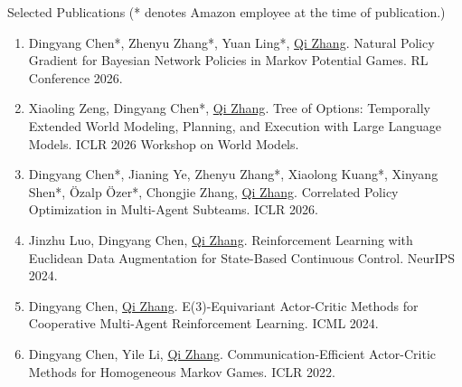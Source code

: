 \begin{rSection}{Selected Publications}
{\small (* denotes Amazon employee at the time of publication.)}

\begin{enumerate}[leftmargin=*,label=\arabic*.]

\item   
Dingyang Chen*, Zhenyu Zhang*, Yuan Ling*,  \underline{Qi Zhang}.
{Natural Policy Gradient for Bayesian Network Policies in Markov Potential Games.}
RL Conference 2026.

\item   
Xiaoling Zeng, Dingyang Chen*,  \underline{Qi Zhang}.
{Tree of Options: Temporally Extended World Modeling, Planning, and Execution with Large Language Models.}
ICLR 2026 Workshop on World Models.

\item   
Dingyang Chen*, Jianing Ye, Zhenyu Zhang*, Xiaolong Kuang*, Xinyang Shen*, Özalp Özer*, Chongjie Zhang,  \underline{Qi Zhang}.
{Correlated Policy Optimization in Multi-Agent Subteams.}
ICLR 2026.


\item
Jinzhu Luo, Dingyang Chen, \underline{Qi Zhang}.
{Reinforcement Learning with Euclidean Data Augmentation for State-Based Continuous Control.}
NeurIPS 2024.


\item
Dingyang Chen, \underline{Qi Zhang}.
{E(3)-Equivariant Actor-Critic Methods for Cooperative Multi-Agent Reinforcement Learning.}
ICML 2024.

\item
Dingyang Chen, Yile Li, \underline{Qi Zhang}.
{Communication-Efficient Actor-Critic Methods for Homogeneous Markov Games.}
ICLR 2022.

\end{enumerate}

\end{rSection}
